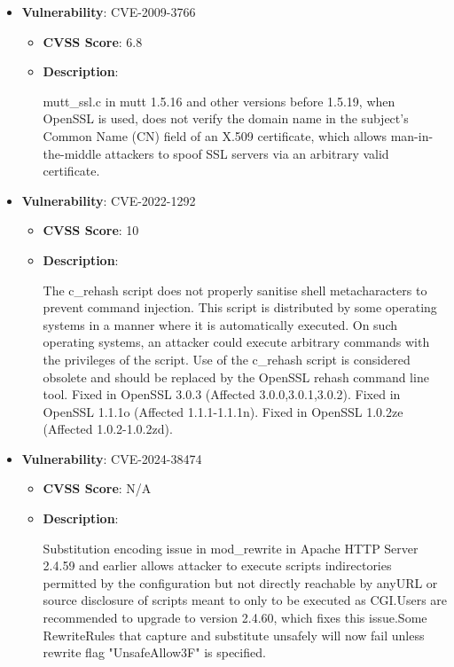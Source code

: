 \documentclass{article}
\begin{document}
\begin{itemize}
        \item \textbf{Vulnerability}: CVE-2009-3766
        \begin{itemize}
            \item \textbf{CVSS Score}:  6.8 
            \item \textbf{Description}:
            \parbox[t]{0.9\linewidth}{
                \ttfamily mutt\_ssl.c in mutt 1.5.16 and other versions before 1.5.19, when OpenSSL is used, does not verify the domain name in the subject's Common Name (CN) field of an X.509 certificate, which allows man-in-the-middle attackers to spoof SSL servers via an arbitrary valid certificate.
            }
        \end{itemize}
    
        \item \textbf{Vulnerability}: CVE-2022-1292
        \begin{itemize}
            \item \textbf{CVSS Score}:  10 
            \item \textbf{Description}:
            \parbox[t]{0.9\linewidth}{
                \ttfamily The c\_rehash script does not properly sanitise shell metacharacters to prevent command injection. This script is distributed by some operating systems in a manner where it is automatically executed. On such operating systems, an attacker could execute arbitrary commands with the privileges of the script. Use of the c\_rehash script is considered obsolete and should be replaced by the OpenSSL rehash command line tool. Fixed in OpenSSL 3.0.3 (Affected 3.0.0,3.0.1,3.0.2). Fixed in OpenSSL 1.1.1o (Affected 1.1.1-1.1.1n). Fixed in OpenSSL 1.0.2ze (Affected 1.0.2-1.0.2zd).
            }
        \end{itemize}
    
        \item \textbf{Vulnerability}: CVE-2024-38474
        \begin{itemize}
            \item \textbf{CVSS Score}:  N/A 
            \item \textbf{Description}:
            \parbox[t]{0.9\linewidth}{
                \ttfamily Substitution encoding issue in mod\_rewrite in Apache HTTP Server 2.4.59 and earlier allows attacker to execute scripts indirectories permitted by the configuration but not directly reachable by anyURL or source disclosure of scripts meant to only to be executed as CGI.Users are recommended to upgrade to version 2.4.60, which fixes this issue.Some RewriteRules that capture and substitute unsafely will now fail unless rewrite flag "UnsafeAllow3F" is specified.
            }
        \end{itemize}
    

\end{itemize}
\end{document}
